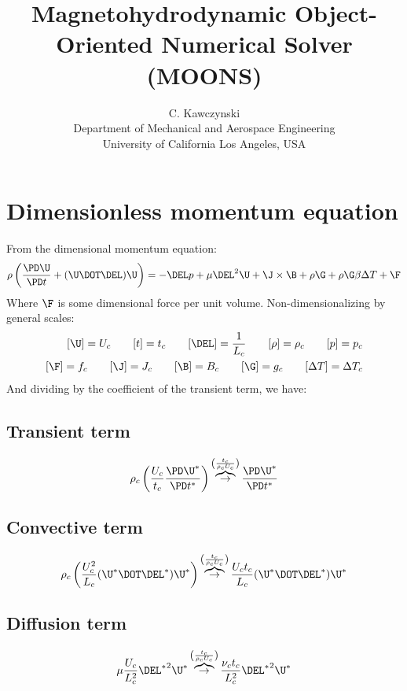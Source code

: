 \documentclass[11pt]{article}
\newcommand{\OB}{\overbrace{\rightarrow}^{\left(\frac{t_c}{\rho_c U_c}\right)}}
\begin{document}
\doublespacing
\title{Magnetohydrodynamic Object-Oriented Numerical Solver (MOONS)}
\author{C. Kawczynski \\
Department of Mechanical and Aerospace Engineering \\
University of California Los Angeles, USA\\
}
\maketitle

\section{Dimensionless momentum equation}
From the dimensional momentum equation:
\begin{equation}
	\rho \left( \frac{\PD \U}{\PD t} + (\U \DOT \DEL) \U \right) = 
	-\DEL p + \mu \DEL^2 \U + \J \times \B + \rho \G + \rho \G \beta \Delta T + \F
\end{equation}
Where $\F$ is some dimensional force per unit volume. Non-dimensionalizing by general scales:
\begin{equation}\begin{aligned}
	[\U] = U_c \qquad
	[t] = t_c \qquad
	[\DEL] = \frac{1}{L_c} \qquad
	[\rho] = \rho_c \qquad
	[p] = p_c \\
	[\F] = f_c \qquad
	[\J] = J_c \qquad
	[\B] = B_c \qquad
	[\G] = g_c \qquad
	[\Delta T] = \Delta T_c
\end{aligned}\end{equation}
And dividing by the coefficient of the transient term, we have:
\subsection{Transient term}
\begin{equation}
	\rho_c \left( \frac{U_c}{t_c} \frac{\PD \U^*}{\PD t^*} \right) 
	\OB
	\frac{\PD \U^*}{\PD t^*}
\end{equation}
\subsection{Convective term}
\begin{equation}
	\rho_c \left( \frac{U_c^2}{L_c} (\U^* \DOT \DEL^*) \U^* \right)
	\OB
	\frac{U_c t_c}{L_c} (\U^* \DOT \DEL^*) \U^*
\end{equation}
\subsection{Diffusion term}
\begin{equation}
	\mu \frac{U_c}{L_c^2} {\DEL^*}^2 \U^*
	\OB
	\frac{\nu_c t_c}{L_c^2} {\DEL^*}^2 \U^*
\end{equation}
\end{document}

